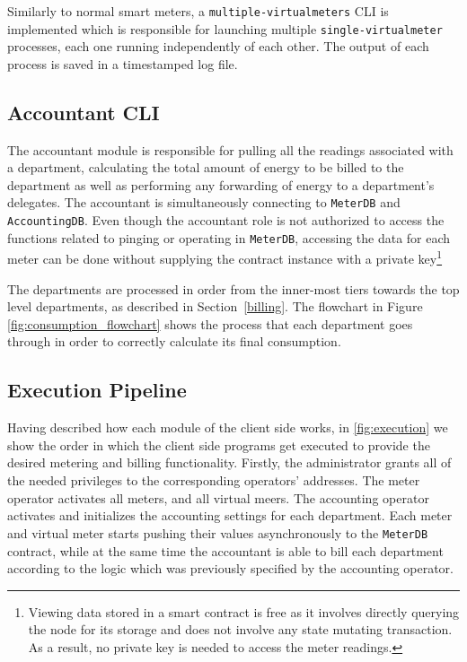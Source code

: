 Similarly to normal smart meters, a \texttt{multiple-virtualmeters} CLI is implemented which is responsible for launching multiple \texttt{single-virtualmeter} processes, each one running independently of each other. The output of each process is saved in a timestamped log file.

\subsection{Accountant CLI}
The accountant module is responsible for pulling all the readings associated with a department, calculating the total amount of energy to be billed to the department as well as performing any forwarding of energy to a department's delegates. The accountant is simultaneously connecting to \texttt{MeterDB} and \texttt{AccountingDB}. Even though the accountant role is not authorized to access the functions related to pinging or operating in \texttt{MeterDB}, accessing the data for each meter can be done without supplying the contract instance with a private key\footnote{Viewing data stored in a smart contract is free as it involves directly querying the node for its storage and does not involve any state mutating transaction. As a result, no private key is needed to access the meter readings.} 

The departments are processed in order from the inner-most tiers towards the top level departments, as described in Section~\ref{billing}. The flowchart in Figure \ref{fig:consumption_flowchart} shows the process that each department goes through in order to correctly calculate its final consumption.



\subsection{Execution Pipeline} \label{execution}

Having described how each module of the client side works, in \ref{fig:execution} we show the order in which the client side programs get executed to provide the desired metering and billing functionality. Firstly, the administrator grants all of the needed privileges to the corresponding operators' addresses. The meter operator activates all meters, and all virtual meers. The accounting operator activates and initializes the accounting settings for each department. Each meter and virtual meter starts pushing their values asynchronously to the \texttt{MeterDB} contract, while at the same time the accountant is able to bill each department according to the logic which was previously specified by the accounting operator.


